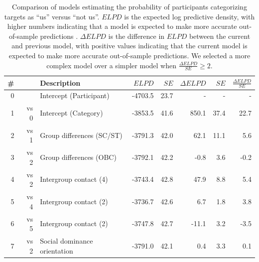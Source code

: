 \documentclass[12pt, a4paper]{article}
\begin{document}
\begin{table}
\caption{
Comparison of models estimating the probability of participants categorizing targets as ``us'' versus ``not us''. $\textit{ELPD}$ is the expected log predictive density, with higher numbers indicating that a model is expected to make more accurate out-of-sample predictions \protect\cite{vehtari_practical_2017}. $\Delta\textit{ELPD}$ is the difference in $\textit{ELPD}$ between the current and previous model, with positive values indicating that the current model is expected to make more accurate out-of-sample predictions. We selected a more complex model over a simpler model when $\frac{\Delta\textit{ELPD}}{\textit{SE}} \geq 2$.%
}
\centering
{}
\small
\begin{tabularx}{\linewidth}{r@{~}rXrrrrr} \toprule
\# &  & Description & $\textit{ELPD}$ & $\textit{SE}$ & $\Delta\textit{ELPD}$ & $\textit{SE}$ & $\frac{\Delta\textit{ELPD}}{\textit{SE}}$ \\ \midrule 
0 &      & Intercept (Participant) & -4703.5 & 23.7 &     - &    - &    - \\ 
1 & vs 0 & Intercept (Category)    & -3853.5 & 41.6 & 850.1 & 37.4 & 22.7 \\
2 & vs 1 & Group differences (SC/ST)       & -3791.3 & 42.0 &  62.1 & 11.1 &  5.6 \\
3 & vs 2 & Group differences (OBC)         & -3792.1 & 42.2 &  -0.8 &  3.6 & -0.2 \\ \midrule
4 & vs 2 & Intergroup contact (4) & -3743.4 & 42.8 &  47.9 &  8.8 &  5.4 \\
5 & vs 4 & Intergroup contact (2) & -3736.7 & 42.6 &   6.7 &  1.8 &  3.8 \\
6 & vs 5 & Intergroup contact (2) & -3747.8 & 42.7 & -11.1 &  3.2 & -3.5 \\
7 & vs 2 & Social dominance orientation & -3791.0 & 42.1 &   0.4 &  3.3 &  0.1 \\
\bottomrule
\end{tabularx}
\label{tab:t2}
\end{table}
\end{document}
